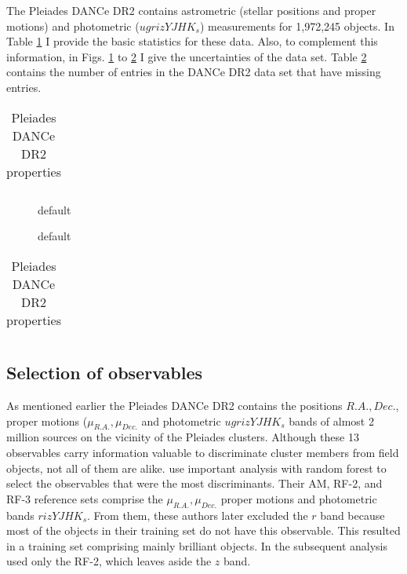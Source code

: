 The Pleiades DANCe DR2 contains astrometric (stellar positions and proper motions) and photometric ($ugrizYJHK_s$) measurements for 1,972,245 objects. In Table \ref{tab:DR2properties} I provide the basic statistics for these data. Also, to complement this information, in Figs. \ref{fig:pmuncert} to \ref{fig:maguncert} I give the uncertainties of the data set. Table \ref{tab:DR2Missing} contains the number of entries in the DANCe DR2 data set that have missing entries.

\begin{table}[htdp]
\caption{Pleiades DANCe DR2 properties}
\begin{center}
\begin{tabular}{|c|c|}

\end{tabular}
\end{center}
\label{tab:DR2properties}
\end{table}%

\begin{figure}[htbp]
\begin{center}
\caption{default}
\label{fig:pmuncert}
\end{center}
\end{figure}

\begin{figure}[htbp]
\begin{center}
\caption{default}
\label{fig:maguncert}
\end{center}
\end{figure}

\begin{table}[htdp]
\caption{Pleiades DANCe DR2 properties}
\begin{center}
\begin{tabular}{|c|c|}

\end{tabular}
\end{center}
\label{tab:DR2Missing}
\end{table}%



\subsection{Selection of observables}
As mentioned earlier the Pleiades DANCe DR2 contains the positions $R.A., Dec.$, proper motions ($\mu_{R.A.},\mu_{Dec.}$ and photometric $ugrizYJHK_s$ bands  of almost 2 million sources on the vicinity of the Pleiades clusters. Although these 13 observables carry information valuable to discriminate cluster members from field objects, not all of them are alike. \citet{Sarro2014} use important analysis with random forest to select the observables that were the most discriminants. Their AM, RF-2, and RF-3 reference sets comprise the $\mu_{R.A.},\mu_{Dec.}$ proper motions and photometric bands $rizYJHK_s$. From them, these authors later excluded the $r$ band because most of the objects in their training set do not have this observable. This resulted in a training set comprising mainly brilliant objects. In the subsequent analysis \citet{Bouy2015} used only the RF-2, which leaves aside the $z$ band.

